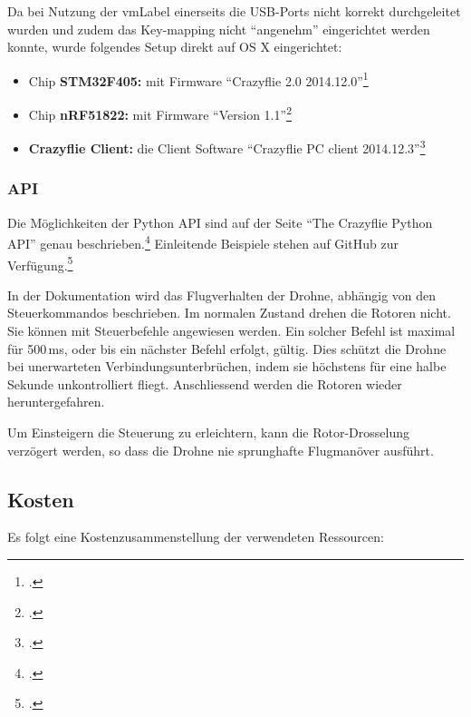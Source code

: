 Da bei Nutzung der \gls{vmLabel} einerseits die USB-Ports nicht korrekt durchgeleitet wurden und zudem das Key-mapping nicht "`angenehm"' eingerichtet werden konnte, wurde folgendes Setup direkt auf OS X eingerichtet:
\begin{itemize}
	\item Chip \textbf{STM32F405:} mit Firmware "`Crazyflie 2.0 2014.12.0"'\footcite{bitcraze_crazyflie-firmware_2015-03-30}
	\item Chip \textbf{nRF51822:} mit Firmware "`Version 1.1"'\footcite{bitcraze_crazyflie2-nrf-firmware_2015-03-30}
	\item \textbf{Crazyflie Client:} die Client Software "`Crazyflie PC client 2014.12.3"'\footcite{bitcraze_crazyflie-clients-python_2015-03-30}
\end{itemize}


\subsubsection{API}
\label{subsubsec:droneApi}
Die Möglichkeiten der Python API sind auf der Seite "`The Crazyflie Python API"' genau beschrieben.\footcite{doc_crazyflie_api_python_index_Bitcraze_Wiki_2015-03-30}
Einleitende Beispiele stehen auf GitHub zur Verfügung.\footcite{crazyflie-clients-python_examples_crazyflie-clients-python_2015-03-30}

In der Dokumentation wird das Flugverhalten der Drohne, abhängig von den Steuerkommandos beschrieben.
Im normalen Zustand drehen die Rotoren nicht.
Sie können mit Steuerbefehle angewiesen werden.
Ein solcher Befehl ist maximal für 500\,ms, oder bis ein nächster Befehl erfolgt, gültig.
Dies schützt die Drohne bei unerwarteten Verbindungsunterbrüchen, indem sie höchstens für eine halbe Sekunde unkontrolliert fliegt.
Anschliessend werden die Rotoren wieder heruntergefahren.

Um Einsteigern die Steuerung zu erleichtern, kann die Rotor-Drosselung verzögert werden, so dass die Drohne nie sprunghafte Flugmanöver ausführt.

\newpage
\subsection{Kosten}
Es folgt eine Kostenzusammenstellung der verwendeten Ressourcen:

